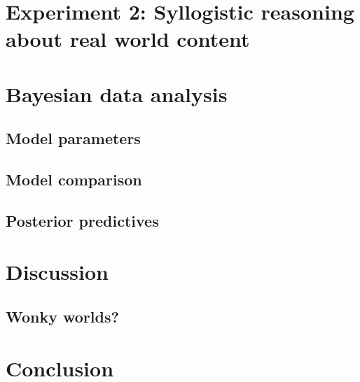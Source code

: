 \documentclass{llncs} %
\newcommand{\denote}[1]{\mbox{ $[\![ #1 ]\!]$}}
\begin{document}

\section{Experiment 2: Syllogistic reasoning about real world content}

\section{Bayesian data analysis}

\subsection{Model parameters}

\subsection{Model comparison}

\subsection{Posterior predictives}


\section{Discussion}

\subsection{Wonky worlds?}
\section{Conclusion}




\end{document}
